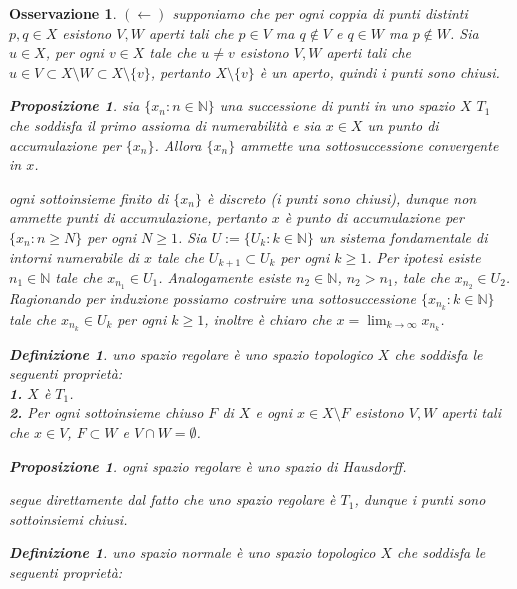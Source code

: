 \documentclass[oneside, 11pt]{amsbook}
\makeatletter
\newcommand{\0}{{(0)}}
\newcommand{\3}{{(3)}}
\theoremstyle{colonplain}
\newtheorem{prop}[thm]{Proposizione}
\theoremstyle{colondefinition}
\newtheorem{defn}[thm]{Definizione}
\theoremstyle{colonremark}
\newtheorem{rmk}[thm]{Osservazione}
\numberwithin{equation}{chapter}
\renewcommand{\proofname}{Dimostrazione}
\renewenvironment{proof}[1][\proofname]{\par
  \pushQED{\end{proof}}%
  \normalfont \topsep6\p@\@plus6\p@\relax
  \trivlist
  \item[\hskip\labelsep\bfseries #1:]\ignorespaces
}{%
  \popQED\endtrivlist\@endpefalse
}
\makeatother
\begin{document}
\begin{rmk}
\begin{proof}
$(\leftarrow)$ supponiamo che per ogni coppia di punti distinti $p, q \in X$ esistono $V, W$ aperti tali che $p \in V$ ma $q \not\in V$ e $q \in W$ ma $p \not\in W$. Sia $u \in X$, per ogni $v \in X$ tale che $u \neq v$ esistono $V, W$ aperti tali che $u \in V \subset X \setminus W \subset X \setminus \{ v \}$, pertanto $X \setminus \{ v \}$ è un aperto, quindi i punti sono chiusi.
\end{proof}
\begin{prop}
sia $\{ x_n : n \in \mathbb{N} \}$ una successione di punti in uno spazio $X$ $T_1$ che soddisfa il primo assioma di numerabilità e sia $x \in X$ un punto di accumulazione per $\{ x_n \}$. Allora $\{ x_n \}$ ammette una sottosuccessione convergente in $x$.
\end{prop}
\begin{proof}
ogni sottoinsieme finito di $\{ x_n \}$ è discreto (i punti sono chiusi), dunque non ammette punti di accumulazione, pertanto $x$ è punto di accumulazione per $\{ x_n : n \geq N \}$ per ogni $N \geq 1$. Sia $U := \{ U_k : k \in \mathbb{N} \}$ un sistema fondamentale di intorni numerabile di $x$ tale che $U_{k + 1} \subset U_k$ per ogni $k \geq 1$. Per ipotesi esiste $n_1 \in \mathbb{N}$ tale che $x_{n_1} \in U_1$. Analogamente esiste $n_2 \in \mathbb{N}$, $n_2 > n_1$, tale che $x_{n_2} \in U_2$. Ragionando per induzione possiamo costruire una sottosuccessione $\{ x_{n_k} : k \in \mathbb{N} \}$ tale che $x_{n_k} \in U_k$ per ogni $k \geq 1$, inoltre è chiaro che $x = \lim_{k \rightarrow \infty} x_{n_k}$.
\end{proof}
\begin{defn}
uno spazio \textit{regolare} è uno spazio topologico $X$ che soddisfa le seguenti proprietà: \\
\textbf{1.} $X$ è $T_1$. \\
\textbf{2.} Per ogni sottoinsieme chiuso $F$ di $X$ e ogni $x \in X \setminus F$ esistono $V, W$ aperti tali che $x \in V$, $F \subset W$ e $V \cap W = \emptyset$.
\end{defn}
\begin{prop}
ogni spazio regolare è uno spazio di Hausdorff.
\end{prop}
\begin{proof}
segue direttamente dal fatto che uno spazio regolare è $T_1$, dunque i punti sono sottoinsiemi chiusi.
\end{proof}
\begin{defn}
uno spazio \textit{normale} è uno spazio topologico $X$ che soddisfa le seguenti proprietà: \\

\end{defn}
\end{rmk}
\end{document}
